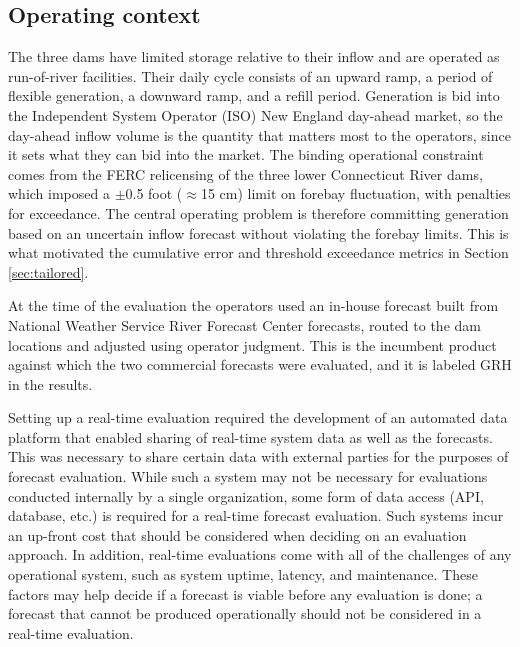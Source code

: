 \documentclass[MLA]{USG} %
\begin{document}
\subsection{Operating context}\label{sec:context}

The three dams have limited storage relative to their inflow and are operated as run-of-river facilities. Their daily cycle consists of an upward ramp, a period of flexible generation, a downward ramp, and a refill period. Generation is bid into the Independent System Operator (ISO) New England day-ahead market, so the day-ahead inflow volume is the quantity that matters most to the operators, since it sets what they can bid into the market. The binding operational constraint comes from the FERC relicensing of the three lower Connecticut River dams, which imposed a $\pm$0.5 foot ($\approx$15 cm) limit on forebay fluctuation, with penalties for exceedance. The central operating problem is therefore committing generation based on an uncertain inflow forecast without violating the forebay limits. This is what motivated the cumulative error and threshold exceedance metrics in Section \ref{sec:tailored}.

At the time of the evaluation the operators used an in-house forecast built from National Weather Service River Forecast Center forecasts, routed to the dam locations and adjusted using operator judgment. This is the incumbent product against which the two commercial forecasts were evaluated, and it is labeled GRH in the results.

Setting up a real-time evaluation required the development of an automated data platform that enabled sharing of real-time system data as well as the forecasts. This was necessary to share certain data with external parties for the purposes of forecast evaluation. While such a system may not be necessary for evaluations conducted internally by a single organization, some form of data access (API, database, etc.) is required for a real-time forecast evaluation. Such systems incur an up-front cost that should be considered when deciding on an evaluation approach. In addition, real-time evaluations come with all of the challenges of any operational system, such as system uptime, latency, and maintenance. These factors may help decide if a forecast is viable before any evaluation is done; a forecast that cannot be produced operationally should not be considered in a real-time evaluation.
\end{document}
